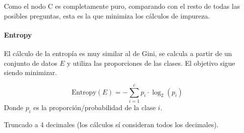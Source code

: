 Como el nodo C es completamente puro, comparando con el resto de todas las posibles preguntas, esta es la que minimiza los cálculos de impureza.

\paragraph{Entropy} El cálculo de la entropía es muy similar al de Gini, se calcula a partir de un conjunto de datos $E$ y utiliza las proporciones de las clases. El objetivo sigue siendo minimizar.

\begin{equation}
\text{Entropy}(E) = - \sum_{i=1}^{c} p_{i} \cdot \log_2(p_i)
\end{equation}
Donde $p_i$ es la proporción/probabilidad de la clase $i$.\newline

\begin{table}[H]
\centering
{}
\begin{tablenotes}
\footnotesize
\item *Truncado a 4 decimales (los cálculos sí consideran todos los decimales).
\end{tablenotes}
\caption{Ejemplo Entropy}
\label{tab:ejemplo_entropy}
\end{table}

